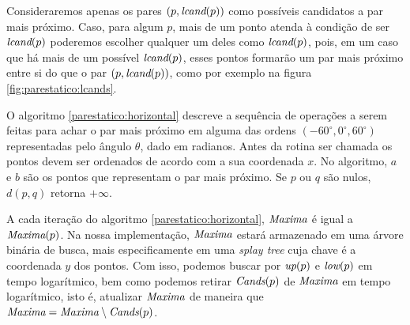 

Consideraremos apenas os pares $(p, \textit{lcand}(p))$ como possíveis
candidatos a par mais próximo. Caso, para algum $p$, mais de um
ponto atenda à condição de ser $\textit{lcand}(p)$ poderemos escolher
qualquer um deles como $\textit{lcand}(p)$, pois, em um caso que há mais de
um possível $\textit{lcand}(p)$, esses pontos formarão um par mais próximo
entre si do que o par $(p, \textit{lcand}(p))$, como por exemplo na figura
\ref{fig:parestatico:lcands}.



O algoritmo \ref{parestatico:horizontal} descreve a sequência de
operações a serem feitas para achar o par mais próximo em alguma das
ordens $(-60^\circ, 0^\circ, 60^\circ)$ representadas pelo ângulo
$\theta$, dado em radianos. Antes da rotina ser chamada os pontos
devem ser ordenados de acordo com a sua coordenada $x$. No
algoritmo, $a$ e $b$ são os pontos que representam o par mais
próximo. Se $p$ ou $q$ são nulos, $d(p,q)$ retorna $+\infty$.

A cada iteração do algoritmo \ref{parestatico:horizontal}, $\textit{Maxima}$
é igual a $\textit{Maxima}(p)$. Na nossa implementação, $\textit{Maxima}$ estará
armazenado em uma árvore binária de busca, mais especificamente em
uma \textit{splay tree} cuja chave é a coordenada $y$ dos pontos.
Com isso, podemos buscar por $\textit{up}(p)$ e $\textit{low}(p)$ em tempo
logarítmico, bem como podemos retirar $\textit{Cands}(p)$ de $\textit{Maxima}$ em
tempo logarítmico, isto é, atualizar $\textit{Maxima}$ de maneira que
$\textit{Maxima} = \textit{Maxima} \setminus \textit{Cands}(p)$.




